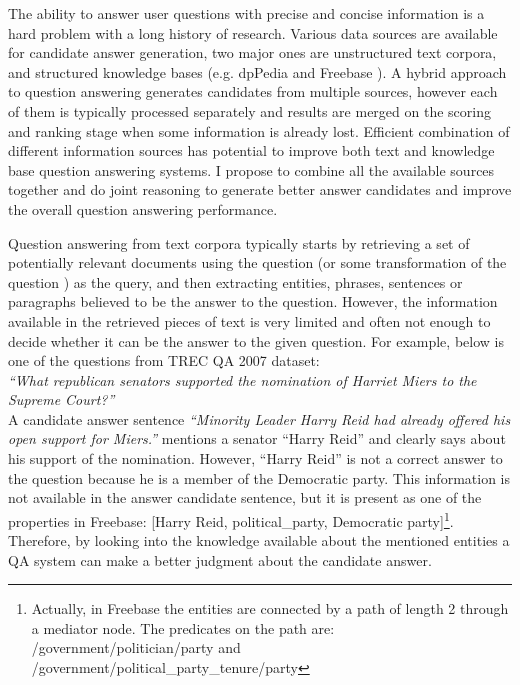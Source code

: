 The ability to answer user questions with precise and concise information is a hard problem with a long history of research.
Various data sources are available for candidate answer generation, two major ones are unstructured text corpora, and structured knowledge bases (e.g. dpPedia \cite{auer2007dbpedia} and Freebase \cite{Bollacker:2008:FCC:1376616.1376746}).
A hybrid approach to question answering \cite{baudivs2015modeling,Ferrucci10:DeepQA} generates candidates from multiple sources, however each of them is typically processed separately and results are merged on the scoring and ranking stage when some information is already lost.
Efficient combination of different information sources has potential to improve both text and knowledge base question answering systems.
I propose to combine all the available sources together and do joint reasoning to generate better answer candidates and improve the overall question answering performance.

Question answering from text corpora typically starts by retrieving a set of potentially relevant documents using the question (or some transformation of the question \cite{AgichteinLG01}) as the query, and then extracting entities, phrases, sentences or paragraphs believed to be the answer to the question.
However, the information available in the retrieved pieces of text is very limited and often not enough to decide whether it can be the answer to the given question.
For example, below is one of the questions from TREC QA 2007 dataset:\\
\textit{``What republican senators supported the nomination of Harriet Miers to the Supreme Court?''}\\
A candidate answer sentence \textit{``Minority Leader Harry Reid had already offered his open support for Miers.''} mentions a senator ``Harry Reid'' and clearly says about his support of the nomination.
However, ``Harry Reid'' is not a correct answer to the question because he is a member of the Democratic party.
This information is not available in the answer candidate sentence, but it is present as one of the properties in Freebase: [Harry Reid, political\_party, Democratic party]\footnote{Actually, in Freebase the entities are connected by a path of length 2 through a mediator node. The predicates on the path are: /government/politician/party and /government/political\_party\_tenure/party}.
Therefore, by looking into the knowledge available about the mentioned entities a QA system can make a better judgment about the candidate answer.

